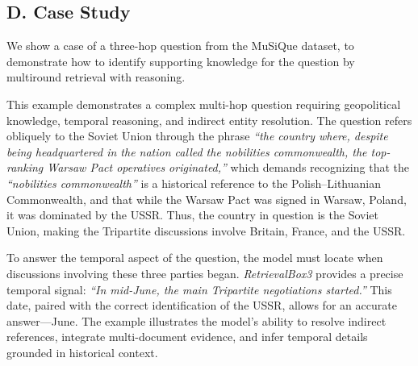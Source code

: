 \subsection*{D. Case Study}

We show a case of a three-hop question from the MuSiQue dataset, to demonstrate how to identify supporting knowledge for the question by multiround retrieval with reasoning. 

This example demonstrates a complex multi-hop question requiring geopolitical knowledge, temporal reasoning, and indirect entity resolution. The question refers obliquely to the Soviet Union through the phrase \textit{“the country where, despite being headquartered in the nation called the nobilities commonwealth, the top-ranking Warsaw Pact operatives originated,”} which demands recognizing that the \textit{“nobilities commonwealth”} is a historical reference to the Polish–Lithuanian Commonwealth, and that while the Warsaw Pact was signed in Warsaw, Poland, it was dominated by the USSR. Thus, the country in question is the Soviet Union, making the Tripartite discussions involve Britain, France, and the USSR.

To answer the temporal aspect of the question, the model must locate when discussions involving these three parties began. \textit{RetrievalBox3} provides a precise temporal signal: \textit{“In mid-June, the main Tripartite negotiations started.”} This date, paired with the correct identification of the USSR, allows for an accurate answer—June. The example illustrates the model’s ability to resolve indirect references, integrate multi-document evidence, and infer temporal details grounded in historical context.







